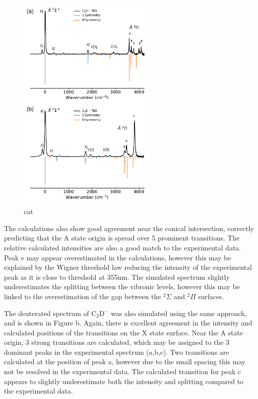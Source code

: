 \documentclass[journal=jpcafh,manuscript=article,layout=onecolumn, 12pt]{achemso}
\begin{document}
\begin{figure}[th!]
	\includegraphics[width=0.6\textwidth]{figures/Fig5.pdf}
	\caption{cat}
	\label{fig:C2H-plot}
\end{figure}

The calculations also show good agreement near the conical intersection, correctly predicting that the A state origin is spread over 5 prominent transitions. The relative calculated intensities are also a good match to the experimental data. Peak e may appear overestimated in the calculations, however this may be explained by the Wigner threshold law reducing the intensity of the experimental peak as it is close to threshold at 355nm. The simulated spectrum slightly underestimates the splitting between the vibronic levels, however this may be linked to the overestimation of the gap between the $^2\Sigma$ and $^2\Pi$ surfaces. 

The deuterated spectrum of C$_2$D$^-$ was also simulated using the same approach, and is shown in Figure b. Again, there is excellent agreement in the intensity and calculated positions of the transitions on the X state surface. Near the A state origin, 3 strong transitions are calculated, which may be assigned to the 3 dominant peaks in the experimental spectrum (a,b,c). Two transitions are calculated at the position of peak a, however due to the small spacing this may not be resolved in the experimental data. The calculated transition for peak c appears to slightly underestimate both the intensity and splitting compared to the experimental data.
\end{document}
